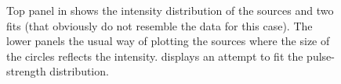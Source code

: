 \begin{figure}[h]
	\caption{Top panel in  shows the intensity distribution of the sources and two fits (that obviously do not resemble the data for this case). The lower panels the usual way of plotting the sources where the size of the circles reflects the intensity.
 displays an attempt to fit the pulse-strength distribution.}	 
\end{figure}

\clearpage
